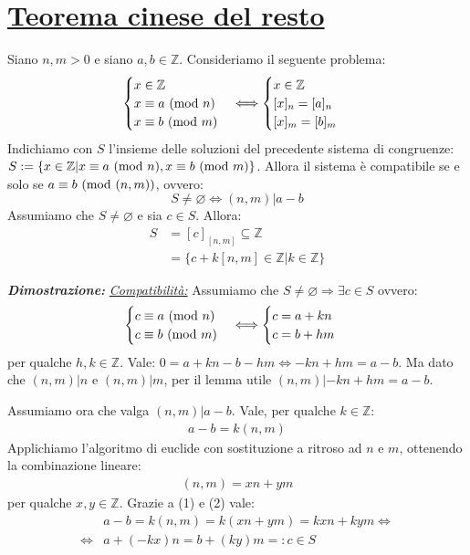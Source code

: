 \section{\underline{Teorema cinese del resto}}
\begin{tcolorbox}[enhanced, breakable, title={Teolema cinese del lesto}]
Siano $n,m>0$ e siano $a,b \in \mathbb{Z}$. Consideriamo il seguente problema:
\[
    \begin{cases}
        x \in \mathbb{Z}\\
        x \equiv a \ (\mathrm{mod}\ n)\\
        x \equiv b \ (\mathrm{mod}\ m)
    \end{cases}
    \Longleftrightarrow
    \begin{cases}
        x \in \mathbb{Z}\\
        [x]_n = [a]_n\\
        [x]_m = [b]_m
    \end{cases}
\]
Indichiamo con $S$ l'insieme delle soluzioni del precedente sistema di congruenze:
$S:=\{ x \in \mathbb{Z}| x \equiv a \ (\mathrm{mod}\ n), x \equiv b \ (\mathrm{mod}\ m) \}$.
Allora il sistema è compatibile se e solo se $a \equiv b \ (\mathrm{mod}\ (n,m))$, ovvero:
\[ S\not = \varnothing \Longleftrightarrow (n,m)|a-b \]
Assumiamo che $S \not = \varnothing$ e sia $c\in S$. Allora:
\begin{align*}
    S &=[c]_{[n,m]} \subseteq \mathbb{Z}\\
    &=\{ c+k[n,m] \in \mathbb{Z}| k \in \mathbb{Z} \}
\end{align*}

\emph{\textbf{Dimostrazione:}} \underline{\emph{Compatibilità:}} Assumiamo che
$S \not = \varnothing \Rightarrow \exists c \in S$ ovvero:
\[
    \begin{cases}
        c \equiv a \ (\mathrm{mod}\ n)\\
        c \equiv b \ (\mathrm{mod}\ m)
    \end{cases}
    \Longleftrightarrow
    \begin{cases}
        c = a+kn\\
        c = b+hm
    \end{cases}
\]
per qualche $h,k \in \mathbb{Z}$. Vale: $ 0 = a+kn - b-hm \Leftrightarrow -kn+hm = a-b $.
Ma dato che $(n,m)|n$ e $(n,m)|m$, per il lemma utile $(n,m)|-kn+hm = a-b$.

Assumiamo ora che valga $(n,m)|a-b$. Vale, per qualche $k \in \mathbb{Z}$:
\begin{align}
    a-b = k(n,m)
\end{align}
Applichiamo l'algoritmo di euclide con sostituzione a ritroso ad $n$ e $m$, ottenendo la
combinazione lineare:
\begin{align}
    (n,m) = xn+ym
\end{align}
per qualche $x,y \in \mathbb{Z}$. Grazie a (1) e (2) vale:
\begin{align*}
    &a-b=k(n,m)=k(xn+ym)=kxn+kym \Leftrightarrow\\
    \Leftrightarrow &a+(-kx)n=b+(ky)m =: c \in S
\end{align*}


\end{tcolorbox}
